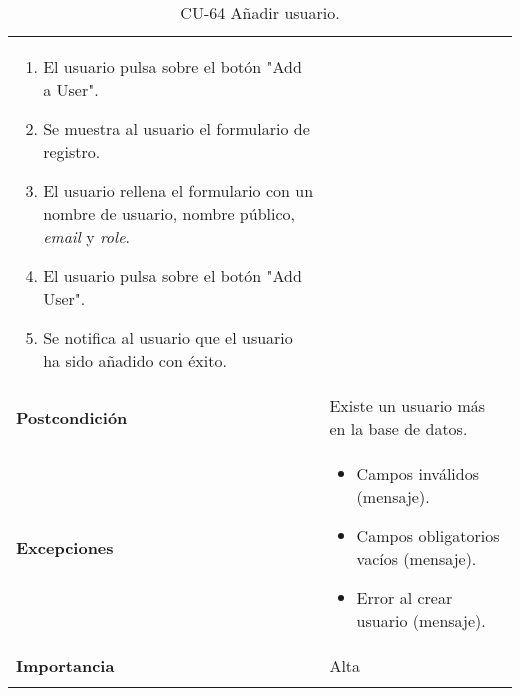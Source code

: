 \begin{longtable}[]{@{}ll@{}}
\begin{minipage}[t]{0.74\columnwidth}
\begin{enumerate}
\tightlist
\item
  El usuario pulsa sobre el botón "Add a User".
\item
  Se muestra al usuario el formulario de registro.
\item
  El usuario rellena el formulario con un nombre de usuario, nombre
  público, \emph{email} y \emph{role}.
\item
  El usuario pulsa sobre el botón "Add User".
\item
  Se notifica al usuario que el usuario ha sido añadido con éxito.
\end{enumerate}\strut
\end{minipage}\tabularnewline
\begin{minipage}[t]{0.20\columnwidth}\raggedright
\textbf{Postcondición}\strut
\end{minipage} & \begin{minipage}[t]{0.74\columnwidth}\raggedright
Existe un usuario más en la base de datos.\strut
\end{minipage}\tabularnewline
\begin{minipage}[t]{0.20\columnwidth}\raggedright
\textbf{Excepciones}\strut
\end{minipage} & \begin{minipage}[t]{0.74\columnwidth}\raggedright
\begin{itemize}
\tightlist
\item
  Campos inválidos (mensaje).
\item
  Campos obligatorios vacíos (mensaje).
\item
  Error al crear usuario (mensaje).
\end{itemize}\strut
\end{minipage}\tabularnewline
\begin{minipage}[t]{0.20\columnwidth}\raggedright
\textbf{Importancia}\strut
\end{minipage} & \begin{minipage}[t]{0.74\columnwidth}\raggedright
Alta\strut
\end{minipage}\tabularnewline
\bottomrule
\caption{CU-64 Añadir usuario.}
\end{longtable}

